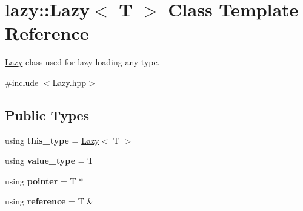 \hypertarget{classlazy_1_1_lazy}{}\section{lazy\+:\+:Lazy$<$ T $>$ Class Template Reference}
\label{classlazy_1_1_lazy}


\hyperlink{classlazy_1_1_lazy}{Lazy} class used for lazy-\/loading any type.  




{\ttfamily \#include $<$Lazy.\+hpp$>$}

\subsection*{Public Types}
\begin{DoxyCompactItemize}
\item 
using {\bfseries this\+\_\+type} = \hyperlink{classlazy_1_1_lazy}{Lazy}$<$ T $>$\hypertarget{classlazy_1_1_lazy_aa7fb382c4ef2db1144914bed435fa947}{}\label{classlazy_1_1_lazy_aa7fb382c4ef2db1144914bed435fa947}

\item 
using {\bfseries value\+\_\+type} = T\hypertarget{classlazy_1_1_lazy_a3739d3ab0ac18b0ae5929f2b3eb46dd7}{}\label{classlazy_1_1_lazy_a3739d3ab0ac18b0ae5929f2b3eb46dd7}

\item 
using {\bfseries pointer} = T $\ast$\hypertarget{classlazy_1_1_lazy_a910e1476f4ab6d55dfac447281c42706}{}\label{classlazy_1_1_lazy_a910e1476f4ab6d55dfac447281c42706}

\item 
using {\bfseries reference} = T \&\hypertarget{classlazy_1_1_lazy_a53b39ad746b1173bb1b56bfce9737946}{}\label{classlazy_1_1_lazy_a53b39ad746b1173bb1b56bfce9737946}

\end{DoxyCompactItemize}
